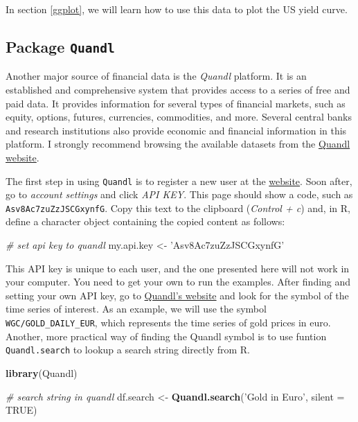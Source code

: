 \documentclass[11pt,]{book}
\newenvironment{Shaded}{\begin{snugshade}}{\end{snugshade}}
\newcommand{\KeywordTok}[1]{\textcolor[rgb]{0.27,0.27,0.27}{\textbf{#1}}}
\newcommand{\DataTypeTok}[1]{\textcolor[rgb]{0.27,0.27,0.27}{#1}}
\newcommand{\StringTok}[1]{\textcolor[rgb]{0.5,0.5,0.5}{#1}}
\newcommand{\CommentTok}[1]{\textcolor[rgb]{0.56,0.35,0.01}{\textit{#1}}}
\newcommand{\OtherTok}[1]{\textcolor[rgb]{0.56,0.35,0.01}{#1}}
\newcommand{\NormalTok}[1]{#1}
\begin{document}
In section \ref{ggplot}, we will learn how to use this data to plot the
US yield curve.

\subsection{\texorpdfstring{Package
\texttt{Quandl}}{Package Quandl}}\label{quandl}

Another major source of financial data is the \emph{Quandl} platform. It
is an established and comprehensive system that provides access to a
series of free and paid data. It provides information for several types
of financial markets, such as equity, options, futures, currencies,
commodities, and more. Several central banks and research institutions
also provide economic and financial information in this platform. I
strongly recommend browsing the available datasets from the
\href{https://www.quandl.com/}{Quandl website}. 

The first step in using \texttt{Quandl} is to register a new user at the
\href{https://www.quandl.com/}{website}. Soon after, go to \emph{account
settings} and click \emph{API KEY}. This page should show a code, such
as \texttt{Asv8Ac7zuZzJSCGxynfG}. Copy this text to the clipboard
(\emph{Control + c}) and, in R, define a character object containing the
copied content as follows:

\begin{Shaded}
\begin{Highlighting}[]
\CommentTok{# set api key to quandl}
\NormalTok{my.api.key <-}\StringTok{ 'Asv8Ac7zuZzJSCGxynfG'}
\end{Highlighting}
\end{Shaded}

This API key is unique to each user, and the one presented here will not
work in your computer. You need to get your own to run the examples.
After finding and setting your own API key, go to
\href{https://www.quandl.com/search?query=}{Quandl's website} and look
for the symbol of the time series of interest. As an example, we will
use the symbol \texttt{WGC/GOLD\_DAILY\_EUR}, which represents the time
series of gold prices in euro. Another, more practical way of finding
the Quandl symbol is to use funtion \texttt{Quandl.search} to lookup a
search string directly from R.

\begin{Shaded}
\begin{Highlighting}[]
\KeywordTok{library}\NormalTok{(Quandl)}

\CommentTok{# search string in quandl}
\NormalTok{df.search <-}\StringTok{ }\KeywordTok{Quandl.search}\NormalTok{(}\StringTok{'Gold in Euro'}\NormalTok{, }\DataTypeTok{silent =} \OtherTok{TRUE}\NormalTok{)}
\end{Highlighting}
\end{Shaded}
\end{document}
